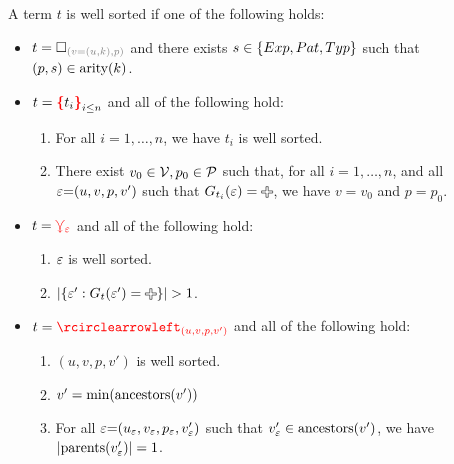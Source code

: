 \begin{definition}
  A term $t$ is well sorted if one of the following holds:
  \begin{itemize}

    \item $t = \emptyHole{v{=}(u, k)}{p}$
      and there exists $s \in \left\{Exp, Pat, Typ\right\}$
      such that $(p, s) \in \operatorname{\text{arity}}\mathopen{}\left(k\right)\mathclose{}$.

    \item $t = \conflictHole{t_i}_{i \leq n}$ and all of the following hold:
      \begin{enumerate}
        \item For all $i = 1, \ldots, n$, we have $t_i$ is well sorted.
        \item
          There exist $v_0 \in \mathcal{V}, p_0 \in \mathcal{P}$ such that,
          for all $i = 1, \ldots, n$,
          and all $\varepsilon{=}(u, v, p, v')$ such that $G_{t_i}(\e) = \Plus$,
          we have $v = v_0$ and $p = p_0$.
      \end{enumerate}

    \item $t = \textcolor{red}{\curlyveedownarrow_{\varepsilon}}$ and all of the following hold:
      \begin{enumerate}
        \item $\varepsilon$ is well sorted.
        \item $\SizeOf{\SetOf{\e' \SuchThat{G_t(\e') = \Plus}}} > 1$.
      \end{enumerate}

    \item $t = \cycleVertex{(u, v, p, v')}$ and all of the following hold:
      \begin{enumerate}
        \item $(u, v, p, v')$ is well sorted.
        \item $v' = \operatorname{\text{min}}\mathopen{}\left(\operatorname{\text{ancestors}}\mathopen{}\left(v'\right)\mathclose{}\right)\mathclose{}$
        \item For all $\varepsilon{=}(u_{\varepsilon}, v_{\varepsilon}, p_{\varepsilon}, v_{\varepsilon}')$
          such that $v_{\varepsilon}' \in \operatorname{\text{ancestors}}\mathopen{}\left(v'\right)\mathclose{}$,
          we have $\left\lvert\operatorname{\text{parents}}\mathopen{}\left(v_{\varepsilon}'\right)\mathclose{}\right\rvert = 1$.
      \end{enumerate}


\end{itemize}
\end{definition}
